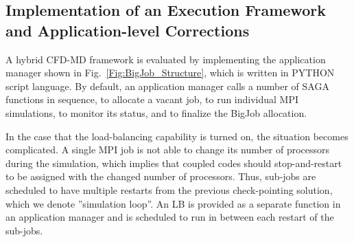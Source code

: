 \documentclass[preprint,12pt]{elsarticle}
\begin{document}



\subsection{Implementation of an Execution Framework and Application-level Corrections}


A hybrid CFD-MD framework is evaluated by implementing the application manager shown in Fig.~\ref{Fig:BigJob_Structure}, which is written in PYTHON script language. By default, an application manager calls a number of SAGA functions in sequence, to allocate a vacant job, to run individual MPI simulations, to monitor its status, and to finalize the BigJob allocation.


In the case that the load-balancing capability is turned on, the situation becomes complicated. A single MPI job is not able to change its number of processors during the simulation, which implies that coupled codes should stop-and-restart to be assigned with the changed number of processors. Thus, sub-jobs are scheduled to have multiple restarts from the previous check-pointing solution, which we denote ''simulation loop''. An LB is provided as a separate function in an application manager and is scheduled to run in between each restart of the sub-jobs.
\end{document}
